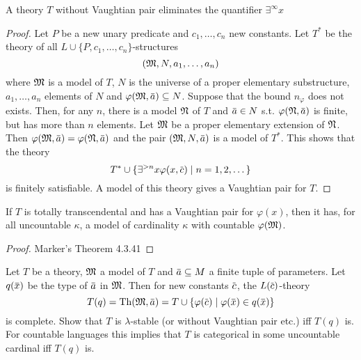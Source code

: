 \documentclass[11pt]{article}
\begin{document}
\begin{lemma}[]
\label{lemma5.5.7}
A theory \(T\) without Vaughtian pair eliminates the quantifier \(\exists^\infty x\)
\end{lemma}


\begin{proof}
Let \(P\) be a new unary predicate and \(c_1,\dots,c_n\) new constants. Let \(T^*\) be the theory
of all \(L\cup\{P,c_1,\dots,c_n\}\)-structures
\begin{equation*}
(\mathfrak{M},N,a_1,\dots,a_n)
\end{equation*}
where \(\mathfrak{M}\) is a model of \(T\), \(N\) is the universe of a proper elementary substructure,
 \(a_1,\dots,a_n\) elements of \(N\) and \(\varphi(\fM,\bara)\subseteq N\).
Suppose that the
bound \(n_\varphi\) does not exists. Then, for any \(n\), there is a model \(\mathfrak{N}\) of \(T\)
and \(\bara\in N\) s.t. \(\varphi(\fN,\bara)\) is finite, but has more than \(n\) elements. Let \(\mathfrak{M}\) be a
proper elementary extension of \(\mathfrak{N}\).
Then \(\varphi(\fM,\bara)=\varphi(\fN,\bara)\)
and the pair \((\fM,N,\bara)\) is a model of \(T^*\). This shows
that the theory
\begin{equation*}
T^*\cup\{\exists^{>n}x\varphi(x,\barc)\mid n=1,2,\dots\}
\end{equation*}
is finitely satisfiable. A model of this theory gives a Vaughtian pair for \(T\).
\end{proof}

\begin{exercise}
\label{ex5.5.1}
If \(T\) is totally transcendental and has a Vaughtian pair for \(\varphi(x)\), then it has, for all
uncountable \(\kappa\), a model of cardinality \(\kappa\) with countable \(\varphi(\mathfrak{M})\).
\end{exercise}

\begin{proof}
Marker's Theorem 4.3.41
\end{proof}

\begin{exercise}
\label{ex5.5.4}
Let \(T\) be a theory, \(\mathfrak{M}\) a model of \(T\) and \(\bara\subseteq M\) a finite tuple of parameters.
Let \(q(\barx)\) be the type of \(\bara\) in \(\mathfrak{M}\). Then for new constants \(\barc\),
the \(L(\barc)\)-theory
\begin{equation*}
T(q)=\Th(\fM,\bara)=T\cup\{\varphi(\barc)\mid\varphi(\barx)\in q(\barx)\}
\end{equation*}
is complete. Show that \(T\) is \(\lambda\)-stable (or without Vaughtian pair etc.) iff \(T(q)\) is. For
countable languages this implies that \(T\) is categorical in some uncountable cardinal
iff \(T(q)\) is.
\end{exercise}
\end{document}
